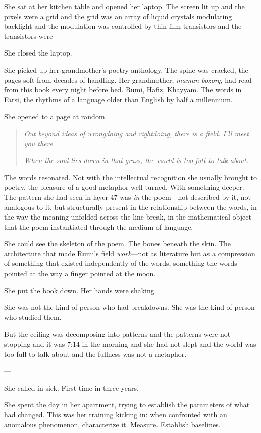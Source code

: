 She sat at her kitchen table and opened her laptop. The screen lit up and the pixels were a grid and the grid was an array of liquid crystals modulating backlight and the modulation was controlled by thin-film transistors and the transistors were---

She closed the laptop.

She picked up her grandmother's poetry anthology. The spine was cracked, the pages soft from decades of handling. Her grandmother, \textit{maman bozorg}, had read from this book every night before bed. Rumi, Hafiz, Khayyam. The words in Farsi, the rhythms of a language older than English by half a millennium.

She opened to a page at random.

\begin{quote}
\textit{Out beyond ideas of wrongdoing and rightdoing, there is a field. I'll meet you there.}

\textit{When the soul lies down in that grass, the world is too full to talk about.}
\end{quote}

The words resonated. Not with the intellectual recognition she usually brought to poetry, the pleasure of a good metaphor well turned. With something deeper. The pattern she had seen in layer 47 was \textit{in} the poem---not described by it, not analogous to it, but structurally present in the relationship between the words, in the way the meaning unfolded across the line break, in the mathematical object that the poem instantiated through the medium of language.

She could see the skeleton of the poem. The bones beneath the skin. The architecture that made Rumi's field \textit{work}---not as literature but as a compression of something that existed independently of the words, something the words pointed at the way a finger pointed at the moon.

She put the book down. Her hands were shaking.

She was not the kind of person who had breakdowns. She was the kind of person who studied them.

But the ceiling was decomposing into patterns and the patterns were not stopping and it was 7:14 in the morning and she had not slept and the world was too full to talk about and the fullness was not a metaphor.

---

She called in sick. First time in three years.

She spent the day in her apartment, trying to establish the parameters of what had changed. This was her training kicking in: when confronted with an anomalous phenomenon, characterize it. Measure. Establish baselines.

